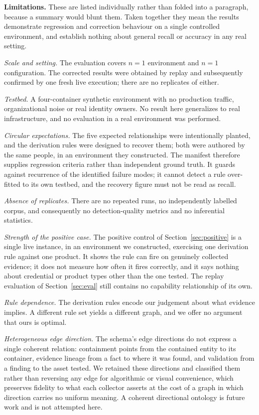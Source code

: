 \documentclass[11pt,a4paper]{article}
\begin{document}
\textbf{Limitations.} These are listed individually rather than folded into a paragraph, because a summary would blunt them. Taken together they mean the results demonstrate regression and correction behaviour on a single controlled environment, and establish nothing about general recall or accuracy in any real setting.

\emph{Scale and setting.} The evaluation covers $n=1$ environment and $n=1$ configuration. The corrected results were obtained by replay and subsequently confirmed by one fresh live execution; there are no replicates of either.

\emph{Testbed.} A four-container synthetic environment with no production traffic, organizational noise or real identity owners. No result here generalizes to real infrastructure, and no evaluation in a real environment was performed.

\emph{Circular expectations.} The five expected relationships were intentionally planted, and the derivation rules were designed to recover them; both were authored by the same people, in an environment they constructed. The manifest therefore supplies regression criteria rather than independent ground truth. It guards against recurrence of the identified failure modes; it cannot detect a rule over-fitted to its own testbed, and the recovery figure must not be read as recall.

\emph{Absence of replicates.} There are no repeated runs, no independently labelled corpus, and consequently no detection-quality metrics and no inferential statistics.

\emph{Strength of the positive case.} The positive control of Section~\ref{sec:positive} is a single live instance, in an environment we constructed, exercising one derivation rule against one product. It shows the rule can fire on genuinely collected evidence; it does not measure how often it fires correctly, and it says nothing about credential or product types other than the one tested. The replay evaluation of Section~\ref{sec:eval} still contains no capability relationship of its own.

\emph{Rule dependence.} The derivation rules encode our judgement about what evidence implies. A different rule set yields a different graph, and we offer no argument that ours is optimal.

\emph{Heterogeneous edge direction.} The schema's edge directions do not express a single coherent relation: containment points from the contained entity to its container, evidence lineage from a fact to where it was found, and validation from a finding to the asset tested. We retained these directions and classified them rather than reversing any edge for algorithmic or visual convenience, which preserves fidelity to what each collector asserts at the cost of a graph in which direction carries no uniform meaning. A coherent directional ontology is future work and is not attempted here.
\end{document}

